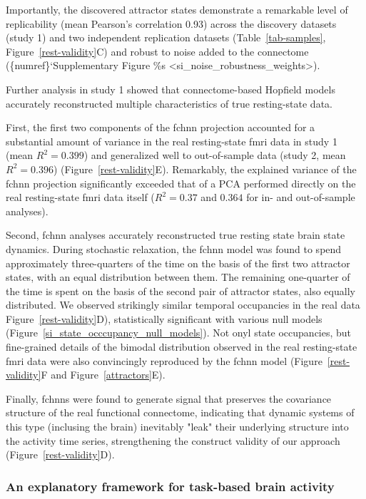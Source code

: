 \documentclass{article}
\begin{document}
Importantly, the discovered attractor states demonstrate a remarkable level of replicability (mean Pearson's
correlation 0.93) across the discovery datasets (study 1) and two independent replication datasets
(Table~\ref{tab-samples}, Figure~\ref{rest-validity}C) and robust to noise added to the connectome (\{numref\}`Supplementary Figure \%s \textless si\_noise\_robustness\_weights\textgreater ).

Further analysis in study 1 showed that connectome-based Hopfield models accurately reconstructed multiple
characteristics of true resting-state data.

First, the first two components of the \acrshort{fchnn} projection accounted for a substantial amount of variance in the real resting-state \acrshort{fmri} data in study 1 (mean $R^2=0.399$) and generalized well to out-of-sample data (study 2, mean $R^2=0.396$)  (Figure~\ref{rest-validity}E). Remarkably, the explained variance of the \acrshort{fchnn} projection significantly exceeded that of a PCA performed directly on the real resting-state \acrshort{fmri} data itself ($R^2=0.37$ and $0.364$ for in- and out-of-sample analyses).

Second, \acrshort{fchnn} analyses accurately reconstructed true resting state brain state dynamics. During stochastic relaxation, the \acrshort{fchnn} model was found to spend approximately three-quarters of the time on the basis of the first two attractor states, with an equal distribution between them. The remaining one-quarter of the time is spent on the basis of the second pair of attractor states, also equally distributed. We observed strikingly similar temporal occupancies in the real data Figure~\ref{rest-validity}D), statistically significant with various null models (Figure~\ref{si_state_occcupancy_null_models}). Not onyl state occupancies, but fine-grained details of the bimodal distribution observed in the real resting-state \acrshort{fmri} data were also convincingly reproduced by the \acrshort{fchnn} model (Figure~\ref{rest-validity}F and Figure~\ref{attractors}E).

Finally, \acrshort{fchnn}s were found to generate signal that preserves the covariance structure of the real functional connectome, indicating that dynamic systems of this type (inclusing the brain) inevitably "leak" their underlying structure into the activity time series, strengthening the construct validity of our approach (Figure~\ref{rest-validity}D).

\subsubsection{An explanatory framework for task-based brain activity}
\end{document}

